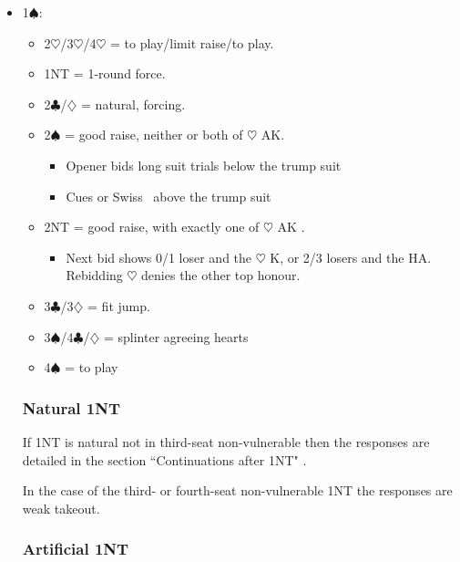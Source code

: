 \documentclass[a4paper,14pt]{extarticle}
\begin{document}
\begin{itemize}
\item 1$\spadesuit$:
	\begin{itemize}
   \item 2$\heartsuit$/3$\heartsuit$/4$\heartsuit$ = to play/limit raise/to play.
   \item 1NT = 1-round force.
   \item 2$\clubsuit$/$\diamondsuit$ = natural, forcing.
   \item 2$\spadesuit$ = good raise, neither or both of $\heartsuit$ AK.
		\begin{itemize}
		\item Opener bids long suit trials below the trump suit
		\item Cues or Swiss~ above the trump suit
		\end{itemize}
   \item 2NT = good raise, with exactly one of $\heartsuit$ AK .
		\begin{itemize}
      \item Next bid shows 0/1 loser and the $\heartsuit$ K, or 2/3 losers and the HA.
         Rebidding $\heartsuit$ denies the other top honour.
		\end{itemize}
   \item 3$\clubsuit$/3$\diamondsuit$ = fit jump.
   \item 3$\spadesuit$/4$\clubsuit$/$\diamondsuit$ = splinter agreeing hearts
   \item 4$\spadesuit$ = to play
	\end{itemize}

\subsubsection{Natural 1NT}
\label{sec:resp:1nnat}

If 1NT is natural not in third-seat non-vulnerable then the responses are
detailed in the section ``Continuations after 1NT" .

In the case of the third- or fourth-seat non-vulnerable 1NT the responses are
weak takeout.

\subsubsection{Artificial 1NT}
\label{sec:resp:1nart}


\end{itemize}
\end{document}
